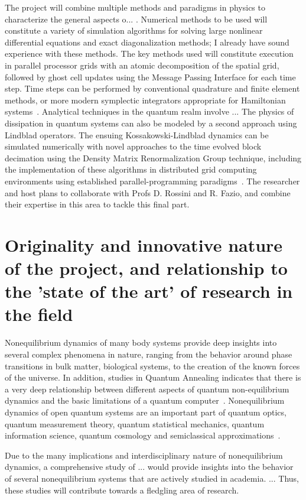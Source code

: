 \documentclass[a4paper,11pt,color]{article}
\begin{document}
The project will combine  multiple methods and paradigms in physics to characterize the general aspects o...
. Numerical methods to be used will constitute a variety of simulation algorithms for solving  large nonlinear differential equations and exact diagonalization methods; I already have sound experience with these methods. The key methods used will constitute execution in parallel processor grids with an atomic decomposition of the spatial grid, followed by ghost cell updates using the Message Passing Interface for each time step. Time steps can be performed by conventional quadrature and finite element methods, or more modern symplectic integrators appropriate for Hamiltonian systems~\cite{symplectic}. Analytical techniques in the quantum realm involve ... The physics of dissipation in quantum systems can also be modeled by a second approach using Lindblad operators. The ensuing Kossakowski-Lindblad dynamics  can be simulated numerically with novel approaches to the time evolved block decimation using the Density Matrix Renormalization Group technique, including the implementation of these algorithms in distributed grid computing environments using established parallel-programming paradigms~\cite{white:pdmrg}. The researcher and host plans to collaborate with Profs D. Rossini and R. Fazio, and combine their expertise in this area to tackle this final part.

\section{Originality and innovative nature of the project, and relationship to the 'state of the art' of research in the field}
\label{sec:originality}
Nonequilibrium dynamics of many body systems provide deep insights into several complex phenomena in nature, ranging from the behavior around phase transitions in bulk matter, biological systems,  to the creation of the known forces of the universe. In addition, studies in Quantum Annealing indicates that there is a very deep relationship between different aspects of quantum non-equilibrium dynamics and the basic limitations of a quantum computer~\cite{annealing}. Nonequilibrium dynamics of open quantum systems are an important part of quantum optics, quantum measurement theory, quantum statistical mechanics, quantum information science, quantum cosmology and semiclassical approximations~\cite{openq}. 

Due to the many implications and interdisciplinary nature of nonequilibrium dynamics, a comprehensive study of ... would provide insights into the behavior of several nonequilibrium systems that are actively studied in academia. ... Thus, these studies will contribute towards a fledgling area of research. 
\end{document}
